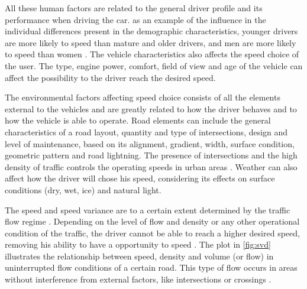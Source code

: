 
All these human factors are related to the general driver profile and its performance when driving the car. as an example of the influence in the individual differences present in the demographic characteristics, younger drivers are more likely to speed than mature and older drivers, and men are more likely to speed than women \cite{Shinar2017}. The vehicle characteristics also affects the speed choice of the user. The type, engine power, comfort, field of view and age of the vehicle can affect the possibility to the driver reach the desired speed. 



The environmental factors affecting speed choice consists of all the elements external to the vehicles and are greatly related to how the driver behaves and to how the vehicle is able to operate. Road elements can include the general characteristics of a road layout, quantity and type of intersections, design and level of maintenance, based on its alignment, gradient, width, surface condition, geometric pattern and road lightning. The presence of intersections and the high density of traffic controls the operating speeds in urban areas \cite{Mohan2016a}. Weather can also affect how the driver will chose his speed, considering its effects on surface conditions (dry, wet, ice) and natural light.  

The speed and speed variance are to a certain extent determined by the traffic flow regime \cite{Shinar2017}. Depending on the level of flow and density or any other operational condition of the traffic, the driver cannot be able to reach a higher desired speed, removing his ability to have a opportunity to speed \cite{Richard2013a, Bastos2021}. The plot in \autoref{fig:svd} illustrates the relationship between speed, density and volume (or flow) in uninterrupted flow conditions of a certain road. This type of flow occurs in areas without interference from external factors, like intersections or crossings \cite{Green2020}. 

